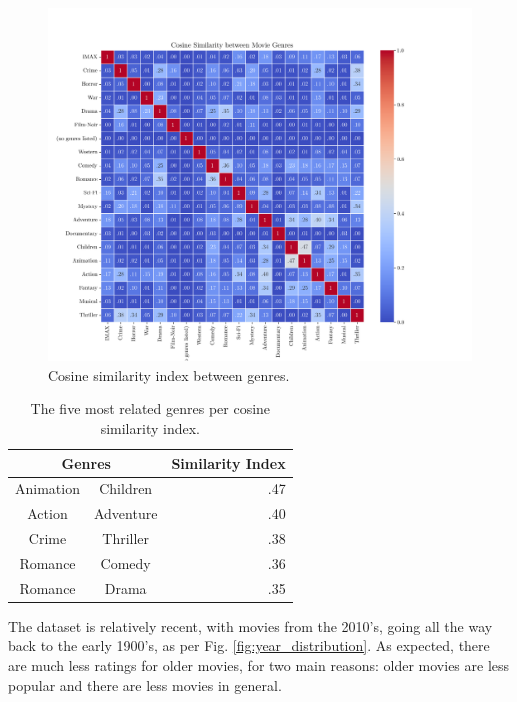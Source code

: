 \documentclass[conference]{IEEEtran}
\begin{document}
\begin{figure}[H]
    \centering
    \includegraphics[width=1\linewidth]{assets/genre_similarity.png}
    \caption{Cosine similarity index between genres.}
    \label{fig:genre_similarity}
\end{figure}

\begin{table}[H]
\centering
\caption{The five most related genres per cosine similarity index.}
\label{tab:genre_similarity}
\begin{tabular}{ccr}
\toprule
\multicolumn{2}{c}{\textbf{Genres}} & \textbf{Similarity Index} \\
\midrule
Animation & Children & .47 \\ 
Action & Adventure & .40 \\
Crime & Thriller & .38 \\
Romance & Comedy & .36 \\
Romance & Drama & .35 \\
\bottomrule
\end{tabular}
\end{table} 

The dataset is relatively recent, with movies from the 2010's, going all the way back to the early 1900's, as per Fig. \ref{fig:year_distribution}. As expected, there are much less ratings for older movies, for two main reasons: older movies are less popular and there are less movies in general.
\end{document}
